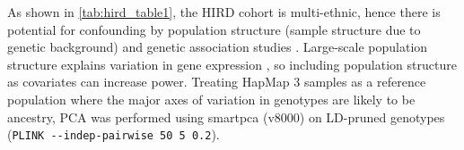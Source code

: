 As shown in \cref{tab:hird_table1}, the \gls{HIRD} cohort is multi-ethnic, hence there is potential for confounding by population structure (sample structure due to genetic background) and genetic association studies \autocite{price2006PrincipalComponentsAnalysis,eu-ahsunthornwattana2014ComparisonMethodsAccount}.
Large-scale population structure explains variation in gene expression \autocite{brown2018ExpressionReflectsPopulation}, so including population structure as covariates can increase power.
Treating HapMap 3 samples \autocite{theinternationalhapmap3consortium2010IntegratingCommonRare} as a reference population where the major axes of variation in genotypes are likely to be ancestry, \gls{PCA} was performed using smartpca (v8000) on \gls{LD}-pruned genotypes (\texttt{PLINK -{}-indep-pairwise 50 5 0.2}).
